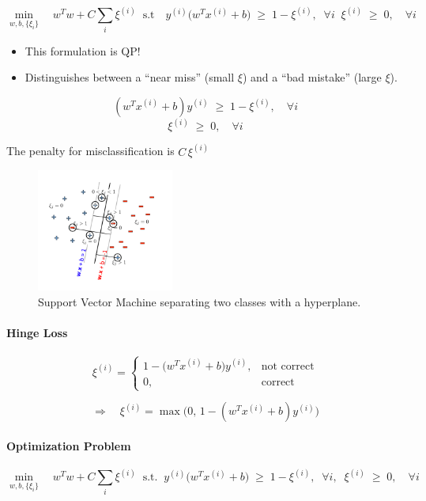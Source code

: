 \documentclass[11pt]{article}
\begin{document}
\[
 \min_{w,b,\{\xi_i\}} \quad w^T w + C \sum_i \xi^{(i)} \; \; \text{s.t} \quad y^{(i)} \big(w^T x^{(i)} + b\big) \;\geq\; 1 - \xi^{(i)}, \; \; \forall i \;\; \xi^{(i)} \;\geq\; 0, \quad \forall i
\]

\begin{itemize}
    \item This formulation is QP!
    \item Distinguishes between a ``near miss'' (small $\xi$) and a ``bad mistake'' (large $\xi$).
\end{itemize}

\[
(w^T x^{(i)} + b) y^{(i)} \;\geq\; 1 - \xi^{(i)}, \quad \forall i
\]
\[
\xi^{(i)} \;\geq\; 0, \quad \forall i
\]

The penalty for misclassification is $C \, \xi^{(i)}$

\begin{figure}[h!]
\centering
\includegraphics[width=0.4\textwidth]{../imgs/svm2.png}
\caption{Support Vector Machine separating two classes with a hyperplane.}
\end{figure}

\paragraph*{Hinge Loss}
\[
\xi^{(i)} =
\begin{cases}
1 - \big(w^T x^{(i)} + b\big)y^{(i)}, & \text{not correct} \\[6pt]
0, & \text{correct}
\end{cases}
\]

\[
\Longrightarrow \quad \xi^{(i)} = \max \big(0, \, 1 - (w^T x^{(i)} + b)y^{(i)}\big)
\]

\paragraph*{Optimization Problem}
\[
 \min_{w,b,\{\xi_i\}} \quad w^T w + C \sum_i \xi^{(i)} 
 \;\; \text{s.t.} \;\; y^{(i)} \big(w^T x^{(i)} + b\big) \;\geq\; 1 - \xi^{(i)}, \;\; \forall i, 
 \;\; \xi^{(i)} \;\geq\; 0, \quad \forall i
\]
\end{document}
